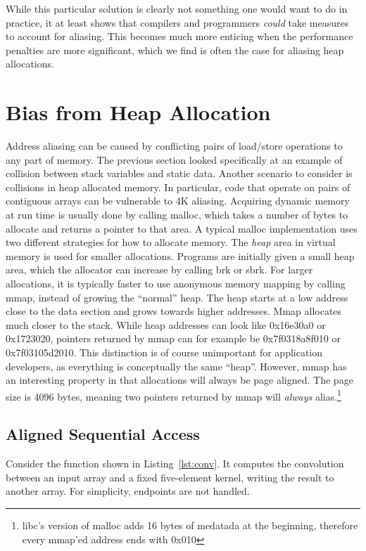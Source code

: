 \documentclass[a4paper,10pt,twocolumn,twoside]{article}
\begin{document}
While this particular solution is clearly not something one would want to do in practice, it at least shows that compilers and programmers \emph{could} take measures to account for aliasing.
This becomes much more enticing when the performance penalties are more significant, which we find is often the case for aliasing heap allocations.


\section{Bias from Heap Allocation}
Address aliasing can be caused by conflicting pairs of load/store operations to any part of memory.
The previous section looked specifically at an example of collision between stack variables and static data.
Another scenario to consider is collisions in heap allocated memory.
In particular, code that operate on pairs of contiguous arrays can be vulnerable to 4K aliasing.
Acquiring dynamic memory at run time is usually done by calling malloc, which takes a number of bytes to allocate and returns a pointer to that area.
A typical malloc implementation uses two different strategies for how to allocate memory.
The \emph{heap} area in virtual memory is used for smaller allocations.
Programs are initially given a small heap area, which the allocator can increase by calling brk or sbrk.
For larger allocations, it is typically faster to use anonymous memory mapping by calling mmap, instead of growing the ``normal'' heap.
The heap starts at a low address close to the data section and grows towards higher addresses. 
Mmap allocates much closer to the stack.
While heap addresses can look like 0x16e30a0 or 0x1723020, pointers returned by mmap can for example be 0x7f0318a8f010 or 0x7f03105d2010.
This distinction is of course unimportant for application developers, as everything is conceptually the same ``heap''.
However, mmap has an interesting property in that allocations will always be page aligned.
The page size is 4096 bytes, meaning two pointers returned by mmap will \emph{always} alias.\footnote{libc's version of malloc adds 16 bytes of medatada at the beginning, therefore every mmap'ed address ends with 0x010}

\subsection{Aligned Sequential Access}
Consider the function shown in Listing~\ref{lst:conv}.
It computes the convolution between an input array and a fixed five-element kernel, writing the result to another array.
For simplicity, endpoints are not handled.
\end{document}
